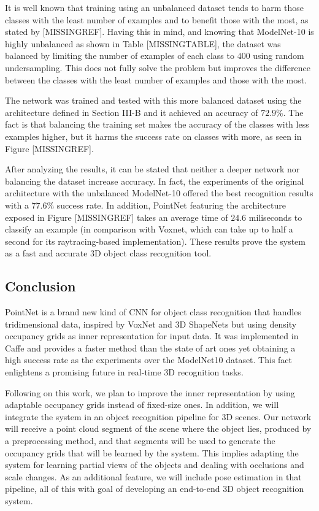 It is well known that training using an unbalanced dataset tends to harm those classes with the least number of examples and to benefit those with the most, as stated by [MISSINGREF]. Having this in mind, and knowing that ModelNet-10 is highly unbalanced as shown in Table [MISSINGTABLE], the dataset was balanced by limiting the number of examples of each class to $400$ using random undersampling. This does not fully solve the problem but improves the difference between the classes with the least number of examples and those with the most.

The network was trained and tested with this more balanced dataset using the architecture defined in Section III-B and it achieved an accuracy of $72.9$\%. The fact is that balancing the training set makes the accuracy of the classes with less examples higher, but it harms the success rate on classes with more, as seen in Figure [MISSINGREF].

After analyzing the results, it can be stated that neither a deeper network nor balancing the dataset increase accuracy. In fact, the experiments of the original architecture with the unbalanced ModelNet-10 offered the best recognition results with a $77.6$\% success rate. In addition, PointNet featuring the architecture exposed in Figure [MISSINGREF] takes an average time of $24.6$ miliseconds to classify an example (in comparison with Voxnet, which can take up to half a second for its raytracing-based implementation). These results prove the system as a fast and accurate 3D object class recognition tool.

\subsection{Conclusion}
\label{cha:objrecog:sec:pointnet:subsec:conclusion}

PointNet is a brand new kind of CNN for object class recognition that handles tridimensional data, inspired by VoxNet and 3D ShapeNets but using density occupancy grids as inner representation for input data. It was implemented in Caffe and provides a faster method than the state of art ones yet obtaining a high success rate as the experiments over the ModelNet10 dataset. This fact enlightens a promising future in real-time 3D recognition tasks.

Following on this work, we plan to improve the inner representation by using adaptable occupancy grids instead of fixed-size ones. In addition, we will integrate the system in an object recognition pipeline for 3D scenes. Our network will receive a point cloud segment of the scene where the object lies, produced by a preprocessing method, and that segments will be used to generate the occupancy grids that will be learned by the system. This implies adapting the system for learning partial views of the objects and dealing with occlusions and scale changes. As an additional feature, we will include pose estimation in that pipeline, all of this with goal of developing an end-to-end 3D object recognition system.

